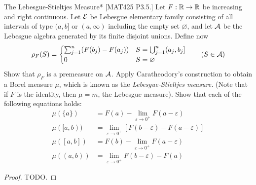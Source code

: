 \begin{problem}{The Lebesgue-Stieltjes Measure}*
    [MAT425 P3.5.] Let \(F : \mathbb{R} \to \mathbb{R}\) be increasing and right continuous. Let \(\mathcal{E}\) be Lebesgue elementary family consisting of all intervals of type \((a, b]\) or \((a, \infty)\) including the empty set \(\varnothing\), and let \(\mathcal{A}\) be the Lebesgue algebra generated by its finite disjoint unions. Define now 
    \[
        \rho_F(S) = \begin{cases}
            \sum_{j=1}^n (F(b_j) - F(a_j)) & S = \bigcup_{j=1}^n (a_j, b_j] \\
            0 & S = \varnothing 
        \end{cases}
        \qquad (S \in \mathcal{A})
    \]
    Show that \(\rho_F\) is a premeasure on \(\mathcal{A}\). Apply Caratheodory's construction to obtain a Borel measure \(\mu\), which is known as the \emph{Lebesgue-Stieltjes measure.} (Note that if \(F\) is the identity, then \(\mu = m\), the Lebesgue measure). Show that each of the following equations holds: 
    \begin{align*}
        \mu(\{a\}) &= F(a) - \lim_{\varepsilon \to 0^+} F(a - \varepsilon) \\
        \mu([a, b)) &= \lim_{\varepsilon \to 0^+} [F(b - \varepsilon) - F(a - \varepsilon)] \\
        \mu([a, b]) &= F(b) - \lim_{\varepsilon \to 0^+} F(a - \varepsilon) \\
        \mu((a, b)) &= \lim_{\varepsilon \to 0^+} F(b - \varepsilon) - F(a) 
    \end{align*}
\end{problem}

\begin{proof}
    TODO. 
\end{proof}


